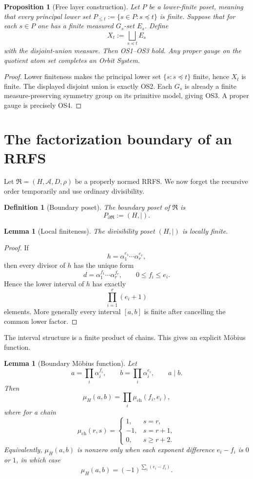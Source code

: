 \documentclass[11pt]{article}
\newtheorem{proposition}[theorem]{Proposition}
\newtheorem{lemma}[theorem]{Lemma}
\newtheorem{definition}[theorem]{Definition}
\newcommand{\cA}{\mathcal A}
\newcommand{\cR}{\mathfrak R}
\begin{document}
\begin{proposition}[Free layer construction]\label{prop:free}
Let $P$ be a lower-finite poset, meaning that every principal lower set $P_{\le t}:=\{s\in P:s\preceq t\}$ is finite. Suppose that for each $s\in P$ one has a finite measured $G_s$-set $E_s$. Define
\[
X_t:=\bigsqcup_{s\preceq t}E_s
\]
with the disjoint-union measure. Then OS1--OS3 hold. Any proper gauge on the quotient atom set completes an Orbit System.
\end{proposition}

\begin{proof}
Lower finiteness makes the principal lower set $\{s:s\preceq t\}$ finite, hence $X_t$ is finite. The displayed disjoint union is exactly OS2. Each $G_s$ is already a finite measure-preserving symmetry group on its primitive model, giving OS3. A proper gauge is precisely OS4.
\end{proof}

\section{The factorization boundary of an RRFS}

Let $\cR=(H,\cA,D,\rho)$ be a properly normed RRFS. We now forget the recursive order temporarily and use ordinary divisibility.

\begin{definition}[Boundary poset]
The boundary poset of $\cR$ is
\[
P_{\partial\cR}:=(H,\mid).
\]
\end{definition}

\begin{lemma}[Local finiteness]\label{lem:localfinite}
The divisibility poset $(H,\mid)$ is locally finite.
\end{lemma}

\begin{proof}
If
\[
h=\alpha_1^{e_1}\cdots\alpha_r^{e_r},
\]
then every divisor of $h$ has the unique form
\[
d=\alpha_1^{f_1}\cdots\alpha_r^{f_r},
\qquad 0\le f_i\le e_i.
\]
Hence the lower interval of $h$ has exactly
\[
\prod_{i=1}^r(e_i+1)
\]
elements. More generally every interval $[a,b]$ is finite after cancelling the common lower factor.
\end{proof}

The interval structure is a finite product of chains. This gives an explicit M\"obius function.

\begin{lemma}[Boundary M\"obius function]\label{lem:mobius}
Let
\[
a=\prod_i\alpha_i^{f_i},\qquad
b=\prod_i\alpha_i^{e_i},\qquad a\mid b.
\]
Then
\[
\mu_H(a,b)=\prod_i\mu_{\mathrm{ch}}(f_i,e_i),
\]
where for a chain
\[
\mu_{\mathrm{ch}}(r,s)=
\begin{cases}
1,&s=r,\\
-1,&s=r+1,\\
0,&s\ge r+2.
\end{cases}
\]
Equivalently, $\mu_H(a,b)$ is nonzero only when each exponent difference $e_i-f_i$ is $0$ or $1$, in which case
\[
\mu_H(a,b)=(-1)^{\sum_i(e_i-f_i)}.
\]
\end{lemma}
\end{document}
